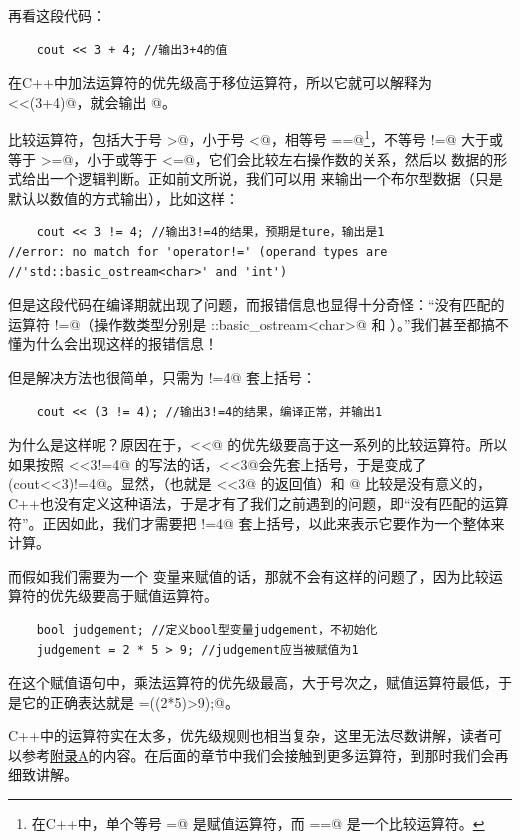 再看这段代码：
\begin{lstlisting}
    cout << 3 + 4; //输出3+4的值
\end{lstlisting}
在C++中加法运算符的优先级高于移位运算符，所以它就可以解释为 \lstinline@cout<<(3+4)@，就会输出 @。\par
比较运算符，包括大于号 \lstinline@>@，小于号 \lstinline@<@，相等号 \lstinline@==@\footnote{在C++中，单个等号 \lstinline@=@ 是赋值运算符，而 \lstinline@==@ 是一个比较运算符。}，不等号 \lstinline@!=@ 大于或等于 \lstinline@>=@，小于或等于 \lstinline@<=@，它们会比较左右操作数的关系，然后以 \lstinline@bool@ 数据的形式给出一个逻辑判断。正如前文所说，我们可以用 \lstinline@cout@ 来输出一个布尔型数据（只是默认以数值的方式输出），比如这样：
\begin{lstlisting}
    cout << 3 != 4; //输出3!=4的结果，预期是ture，输出是1
//error: no match for 'operator!=' (operand types are
//'std::basic_ostream<char>' and 'int')
\end{lstlisting}
但是这段代码在编译期就出现了问题，而报错信息也显得十分奇怪：``没有匹配的运算符 \lstinline@!=@（操作数类型分别是 \lstinline@std::basic_ostream<char>@ 和 \lstinline@int@）。''我们甚至都搞不懂为什么会出现这样的报错信息！\par
但是解决方法也很简单，只需为 !=4@ 套上括号：
\begin{lstlisting}
    cout << (3 != 4); //输出3!=4的结果，编译正常，并输出1
\end{lstlisting}\par
为什么是这样呢？原因在于，\lstinline@<<@ 的优先级要高于这一系列的比较运算符。所以如果按照 \lstinline@cout<<3!=4@ 的写法的话，\lstinline@cout<<3@会先套上括号，于是变成了 \lstinline@(cout<<3)!=4@。显然，\lstinline@cout@（也就是 \lstinline@cout<<3@ 的返回值）和 @ 比较是没有意义的，C++也没有定义这种语法，于是才有了我们之前遇到的问题，即``没有匹配的运算符''。正因如此，我们才需要把 !=4@ 套上括号，以此来表示它要作为一个整体来计算。\par
而假如我们需要为一个 \lstinline@bool@ 变量来赋值的话，那就不会有这样的问题了，因为比较运算符的优先级要高于赋值运算符。\par
\begin{lstlisting}
    bool judgement; //定义bool型变量judgement，不初始化
    judgement = 2 * 5 > 9; //judgement应当被赋值为1
\end{lstlisting}
在这个赋值语句中，乘法运算符的优先级最高，大于号次之，赋值运算符最低，于是它的正确表达就是 \lstinline@judgement=((2*5)>9);@。\par
C++中的运算符实在太多，优先级规则也相当复杂，这里无法尽数讲解，读者可以参考\hyperref[ch:appendix_A]{附录A}的内容。在后面的章节中我们会接触到更多运算符，到那时我们会再细致讲解。\par
